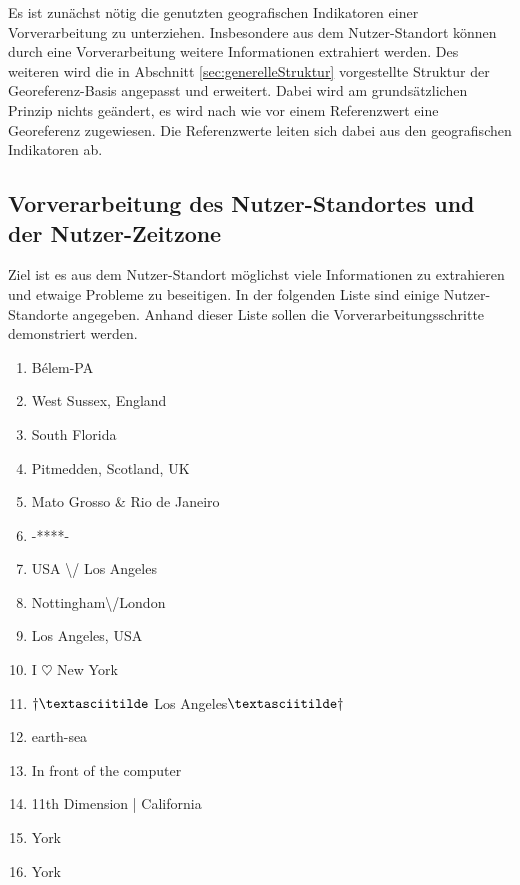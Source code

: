 		Es ist zunächst nötig die genutzten geografischen Indikatoren einer Vorverarbeitung zu unterziehen. 
		Insbesondere aus dem Nutzer-Standort können durch eine Vorverarbeitung weitere Informationen extrahiert werden.
		Des weiteren wird die in Abschnitt \ref{sec:generelleStruktur} vorgestellte Struktur der Georeferenz-Basis angepasst und erweitert. 
		Dabei wird am grundsätzlichen Prinzip nichts geändert, es wird nach wie vor einem Referenzwert eine Georeferenz zugewiesen.
		Die Referenzwerte leiten sich dabei aus den geografischen Indikatoren ab. 

		\subsection{Vorverarbeitung des Nutzer-Standortes und der Nutzer-Zeitzone} \label{subsec:VorverarbeitungStandortZeitzone} 
			
			Ziel ist es aus dem Nutzer-Standort möglichst viele Informationen zu extrahieren und etwaige Probleme zu beseitigen.
			In der folgenden Liste sind einige Nutzer-Standorte angegeben. 
			Anhand dieser Liste sollen die Vorverarbeitungsschritte demonstriert werden.

			\begin{multicols}{2}
			\begin{enumerate}
				\item Bélem-PA
				\item West Sussex, England
				\item South Florida
				\item Pitmedden,  Scotland, UK
				\item Mato Grosso \& Rio de Janeiro
				\item -****-
				\item USA \textbackslash/ Los Angeles
				\item Nottingham\textbackslash/London
				\item Los Angeles, USA
				\item I $\heartsuit$ New York 
				\item $\dagger\textasciitilde$ Los Angeles$\textasciitilde\dagger$
				\item earth-sea
				\item In front of the computer
				\item 11th Dimension | California
				\item York
				\item York
			\end{enumerate}
			\end{multicols}
				
